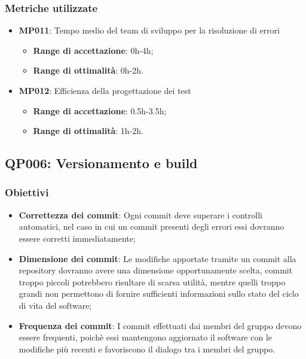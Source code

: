 \subsubsection{Metriche utilizzate}
\begin{itemize}
	\item \textbf{MP011}: Tempo medio del team di sviluppo per la risoluzione di errori
	\begin{itemize}
		\item \textbf{Range di accettazione}: 0h-4h;
		\item \textbf{Range di ottimalità}: 0h-2h.
	\end{itemize}
	\item \textbf{MP012}: Efficienza della progettazione dei test
	\begin{itemize}
		\item \textbf{Range di accettazione}: 0.5h-3.5h;
		\item \textbf{Range di ottimalità}: 1h-2h.
	\end{itemize}
\end{itemize}


\subsection{QP006: Versionamento e build}
\subsubsection{Obiettivi}
\begin{itemize}
	\item \textbf{Correttezza dei commit}: Ogni commit deve superare i controlli automatici, nel caso in cui un commit presenti degli errori  essi dovranno essere corretti immediatamente;
	\item \textbf{Dimensione dei commit}: Le modifiche apportate tramite un commit alla repository dovranno avere una dimensione opportunamente scelta, commit troppo piccoli potrebbero risultare di scarsa utilità, mentre quelli troppo grandi non permettono di fornire sufficienti informazioni sullo stato del ciclo di vita del software;
	\item  \textbf{Frequenza dei commit}: I commit effettuati dai membri del gruppo devono essere frequenti, poichè essi mantengono aggiornato il software con le modifiche più recenti e favoriscono il dialogo tra i membri del gruppo.
	
\end{itemize}
